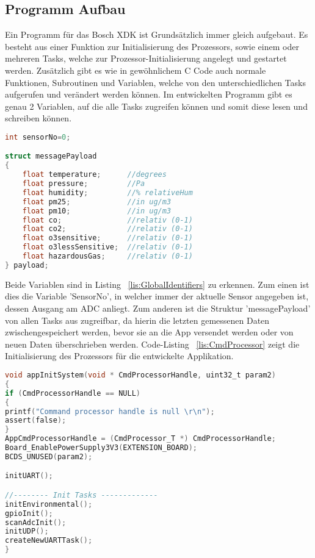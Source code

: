 \subsection{Programm Aufbau}\label{subsec:ProgrammAufbau}
Ein Programm für das Bosch \acs{XDK} ist Grundsätzlich immer gleich aufgebaut. Es besteht aus einer Funktion zur Initialisierung des Prozessors, sowie einem oder mehreren Tasks, welche zur Prozessor-Initialisierung angelegt und gestartet werden. Zusätzlich gibt es wie in gewöhnlichem C Code auch normale Funktionen, Subroutinen und Variablen, welche von den unterschiedlichen Tasks aufgerufen und verändert werden können. Im entwickelten Programm gibt es genau 2 Variablen, auf die alle Tasks zugreifen können und somit diese lesen und schreiben können. 
\newline
\begin{lstlisting}[language=C, caption={Geteilte Variablen}, label=lis:GlobalIdentifiers]
int sensorNo=0;

struct messagePayload
{
	float temperature;		//degrees
	float pressure;			//Pa
	float humidity;			//% relativeHum
	float pm25; 			//in ug/m3
	float pm10; 			//in ug/m3
	float co;				//relativ (0-1)
	float co2; 				//relativ (0-1)
	float o3sensitive; 		//relativ (0-1)
	float o3lessSensitive;	//relativ (0-1)
	float hazardousGas;		//relativ (0-1)
} payload;
\end{lstlisting}
Beide Variablen sind in Listing ~\ref{lis:GlobalIdentifiers} zu erkennen. 
\newline
Zum einen ist dies die Variable 'SensorNo', in welcher immer der aktuelle Sensor angegeben ist, dessen Ausgang am \acs{ADC} anliegt. 
\newline
Zum anderen ist die Struktur 'messagePayload' von allen Tasks aus zugreifbar, da hierin die letzten gemessenen Daten zwischengespeichert werden, bevor sie an die App versendet werden oder von neuen Daten überschrieben werden.
\newline
\newline
Code-Listing ~\ref{lis:CmdProcessor} zeigt die Initialisierung des Prozessors für die entwickelte Applikation.
\begin{lstlisting}[language=C, caption={Prozessor Initialisierung}, label=lis:CmdProcessor]
void appInitSystem(void * CmdProcessorHandle, uint32_t param2)
{
if (CmdProcessorHandle == NULL)
{
printf("Command processor handle is null \r\n");
assert(false);
}
AppCmdProcessorHandle = (CmdProcessor_T *) CmdProcessorHandle;
Board_EnablePowerSupply3V3(EXTENSION_BOARD);
BCDS_UNUSED(param2);

initUART();

//-------- Init Tasks -------------
initEnvironmental();
gpioInit();
scanAdcInit();
initUDP();
createNewUARTTask();
}
\end{lstlisting}
